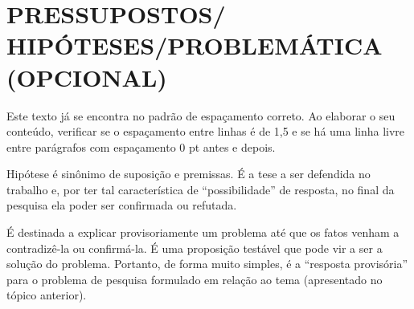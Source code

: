 \section{PRESSUPOSTOS/ HIPÓTESES/PROBLEMÁTICA (OPCIONAL)} 
Este texto já se encontra no padrão de espaçamento correto. Ao elaborar o seu conteúdo, verificar se o espaçamento entre linhas é de 1,5 e se há uma linha livre entre parágrafos com espaçamento 0 pt antes e depois. 

Hipótese é sinônimo de suposição e premissas. É a tese a ser defendida no trabalho e, por ter tal característica de “possibilidade” de resposta, no final da pesquisa ela poder ser confirmada ou refutada.  

É destinada a explicar provisoriamente um problema até que os fatos venham a contradizê-la ou confirmá-la. É uma proposição testável que pode vir a ser a solução do problema.\newline
Portanto, de forma muito simples, é a “resposta provisória” para o problema de pesquisa formulado em relação ao tema (apresentado no tópico anterior).   
